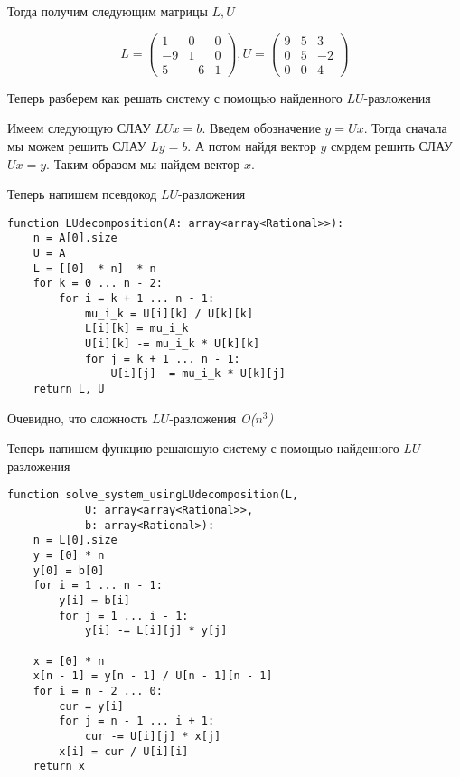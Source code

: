 \documentclass[a4paper,article,14pt]{extarticle}
\begin{document}
Тогда получим следующим матрицы $L, U$

\begin{equation}
    L = \left(
        \begin{matrix}
            1 & 0 & 0 \\
            -9 & 1 & 0 \\
            5 & -6 & 1 
        \end{matrix}
    \right), 
    U = \left(
        \begin{matrix}
            9 & 5 & 3 \\
            0 & 5 & -2 \\
            0 & 0 & 4
        \end{matrix}
    \right)
\end{equation}

Теперь разберем как решать систему с помощью найденного $LU$-разложения

Имеем следующую СЛАУ $LUx = b$. Введем обозначение $ y = Ux $.
Тогда сначала мы можем решить СЛАУ $  Ly = b $. А потом найдя
вектор $y$ смрдем решить СЛАУ $ Ux = y $. Таким образом мы найдем вектор $ x $.

Теперь напишем псевдокод $LU$-разложения 

\begin{lstlisting}
function LUdecomposition(A: array<array<Rational>>):
    n = A[0].size
    U = A
    L = [[0]  * n]  * n
    for k = 0 ... n - 2:
        for i = k + 1 ... n - 1:
            mu_i_k = U[i][k] / U[k][k]
            L[i][k] = mu_i_k
            U[i][k] -= mu_i_k * U[k][k]
            for j = k + 1 ... n - 1:
                U[i][j] -= mu_i_k * U[k][j]
    return L, U
\end{lstlisting}

Очевидно, что сложность $LU$-разложения \emph{O($n^3$)}

Теперь напишем функцию решающую систему с помощью найденного $LU$ разложения

\begin{lstlisting}
function solve_system_usingLUdecomposition(L, 
            U: array<array<Rational>>, 
            b: array<Rational>):
    n = L[0].size
    y = [0] * n
    y[0] = b[0]
    for i = 1 ... n - 1:
        y[i] = b[i]
        for j = 1 ... i - 1:
            y[i] -= L[i][j] * y[j]

    x = [0] * n
    x[n - 1] = y[n - 1] / U[n - 1][n - 1]
    for i = n - 2 ... 0:
        cur = y[i]
        for j = n - 1 ... i + 1:
            cur -= U[i][j] * x[j]
        x[i] = cur / U[i][i]
    return x
\end{lstlisting}
\end{document}
